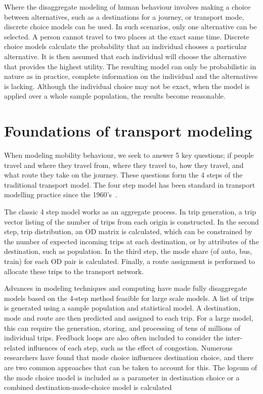Where the disaggregate modeling of human behaviour involves making a choice between alternatives, such as a destinations for a journey, or transport mode, discrete choice models can be used. In such scenarios, only one alternative can be selected. A person cannot travel to two places at the exact same time. Discrete choice models calculate the probability that an individual chooses a particular alternative. It is then assumed that each individual will choose the alternative that provides the highest utility. The resulting model can only be probabilistic in nature as in practice, complete information on the individual and the alternatives is lacking. Although the individual choice may not be exact, when the model is applied  over a whole sample population, the results become reasonable.  

\section{Foundations of transport modeling}
When modeling mobility behaviour, we seek to answer 5 key questions; if people travel and where they travel from, where they travel to, how they travel, and what route they take on the journey. These questions form the 4 steps of the traditional transport model. The four step model has been standard in transport modelling practice since the 1960's~\parencite{de1994modelling}. 

The classic 4 step model works as an aggregate process. In trip generation, a trip vector listing of the number of trips from each origin is constructed. In the second step, trip distribution, an OD matrix is calculated, which can be constrained by the number of expected incoming trips at each destination, or by attributes of the destination, such as population. In the third step, the mode share (of auto, bus, train) for each OD pair is calculated. Finally, a route assignment is performed to allocate these trips to the transport network. 

Advances in modeling techniques and computing have made fully disaggregate models based on the 4-step method feasible for large scale models. A list of trips is generated using a sample population and statistical model. A destination, mode and route are then predicted and assigned to each trip. For a large model, this can require the generation, storing, and processing of tens of millions of individual trips. Feedback loops are also often included to consider the inter-related influences of each step, such as the effect of congestion. Numerous researchers have found that mode choice influences destination choice, and there are two common approaches that can be taken to account for this. The logsum of the mode choice model is included as a parameter in destination choice \parencite{jonnalagadda2001development, mishra2011functional} or a combined destination-mode-choice model is calculated \parencite{newman2010hierarchical, adler1976joint, boyce1983implementation, Outwater15}

